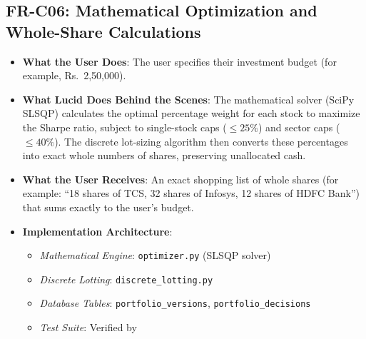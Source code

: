 \subsection{FR-C06: Mathematical Optimization and Whole-Share Calculations}
\begin{itemize}
    \item \textbf{What the User Does}: The user specifies their investment budget (for example, Rs.~2,50,000).
    \item \textbf{What Lucid Does Behind the Scenes}: The mathematical solver (SciPy SLSQP) calculates the optimal percentage weight for each stock to maximize the Sharpe ratio, subject to single-stock caps ($\le 25\%$) and sector caps ($\le 40\%$). The discrete lot-sizing algorithm then converts these percentages into exact whole numbers of shares, preserving unallocated cash.
    \item \textbf{What the User Receives}: An exact shopping list of whole shares (for example: ``18 shares of TCS, 32 shares of Infosys, 12 shares of HDFC Bank'') that sums exactly to the user's budget.
    \item \textbf{Implementation Architecture}:
    \begin{itemize}
        \item \textit{Mathematical Engine}: \texttt{optimizer.py} (SLSQP solver)
        \item \textit{Discrete Lotting}: \texttt{discrete\_lotting.py}
        \item \textit{Database Tables}: \texttt{portfolio\_versions}, \texttt{portfolio\_decisions}
        \item \textit{Test Suite}: Verified by 
    \end{itemize}
\end{itemize}

